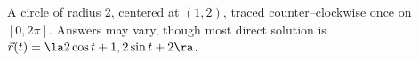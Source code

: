 {A circle of radius 2, centered at $(1,2)$, traced counter--clockwise once on $[0,2\pi]$.
}
{
Answers may vary, though most direct solution is\\
$\vec r(t) = \la 2\cos t+1,2\sin t+2\ra$. 
}

